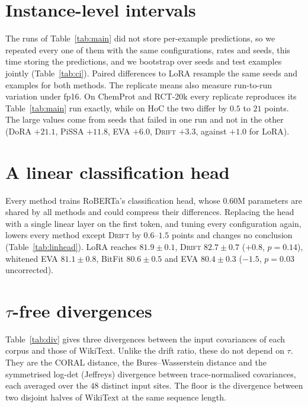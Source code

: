 \documentclass[conference,onecolumn]{IEEEtran}
\newcommand{\method}{\textsc{Drift}}
\begin{document}

\section{Instance-level intervals}
\label{app:ci}
The runs of Table~\ref{tab:main} did not store per-example predictions, so we
repeated every one of them with the same configurations, rates and seeds, this
time storing the predictions, and we bootstrap over seeds and test examples
jointly (Table~\ref{tab:ci}). Paired differences to LoRA resample the same seeds
and examples for both methods. The replicate means also measure run-to-run
variation under fp16. On ChemProt and RCT-20k every replicate reproduces its
Table~\ref{tab:main} run exactly, while on HoC the two differ by $0.5$ to $21$
points. The large values come from seeds that failed in one run and not in the
other (DoRA $+21.1$, PiSSA $+11.8$, EVA $+6.0$, \method{} $+3.3$, against $+1.0$
for LoRA).


\section{A linear classification head}
\label{app:linhead}
Every method trains RoBERTa's classification head, whose $0.60$M parameters are
shared by all methods and could compress their differences. Replacing the head
with a single linear layer on the first token, and tuning every configuration
again, lowers every method except \method{} by $0.6$--$1.5$ points and changes
no conclusion (Table~\ref{tab:linhead}). LoRA reaches $81.9\pm0.1$, \method{}
$82.7\pm0.7$ ($+0.8$, $p = 0.14$), whitened EVA $81.1\pm0.8$, BitFit
$80.6\pm0.5$ and EVA $80.4\pm0.3$ ($-1.5$, $p = 0.03$ uncorrected).


\section{$\tau$-free divergences}
\label{app:div}
Table~\ref{tab:div} gives three divergences between the input covariances of
each corpus and those of WikiText. Unlike the drift ratio, these do not depend
on $\tau$. They are the CORAL distance, the Bures--Wasserstein distance and the
symmetrised log-det (Jeffreys) divergence between trace-normalised covariances,
each averaged over the $48$ distinct input sites. The floor is the divergence
between two disjoint halves of WikiText at the same sequence length.
\end{document}
